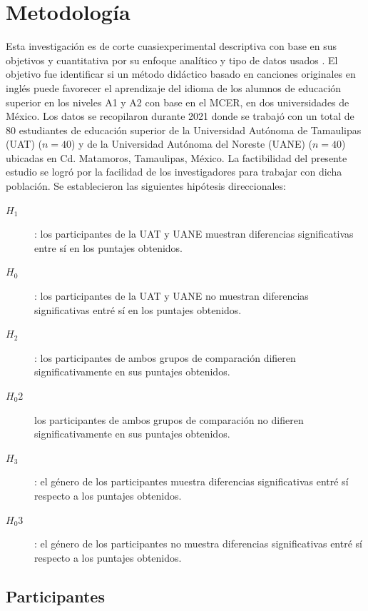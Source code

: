 \documentclass[spanish]{textolivre}
\begin{document}
\section{Metodología}

Esta investigación es de corte cuasiexperimental descriptiva con base en sus objetivos y cuantitativa por su enfoque analítico y tipo de datos usados \cite{hernandez2014metodologia}. El objetivo fue identificar si un método didáctico basado en canciones originales en inglés puede favorecer el aprendizaje del idioma de los alumnos de educación superior en los niveles A1 y A2 con base en el MCER, en dos universidades de México. Los datos se recopilaron durante 2021 donde se trabajó con un total de 80 estudiantes de educación superior de la Universidad Autónoma de Tamaulipas (UAT) ($n=40$) y de la Universidad Autónoma del Noreste (UANE) ($n=40$) ubicadas en Cd. Matamoros, Tamaulipas, México. La factibilidad del presente estudio se logró por la facilidad de los investigadores para trabajar con dicha población. Se establecieron las siguientes hipótesis direccionales:

\begin{description}
\item[$H_1$]: los participantes de la UAT y UANE muestran diferencias significativas entre sí en los puntajes obtenidos.
\item[$H_0$]: los participantes de la UAT y UANE no muestran diferencias significativas entré sí en los puntajes obtenidos.
\item[$H_2$]: los participantes de ambos grupos de comparación difieren significativamente en sus puntajes obtenidos.
\item[$H_0 2$] los participantes de ambos grupos de comparación no difieren significativamente en sus puntajes obtenidos.
\item[$H_3$]: el género de los participantes muestra diferencias significativas entré sí respecto a los puntajes obtenidos.
\item[$H_0 3$]: el género de los participantes no muestra diferencias significativas entré sí respecto a los puntajes obtenidos.
\end{description}



\subsection{Participantes}
\end{document}
